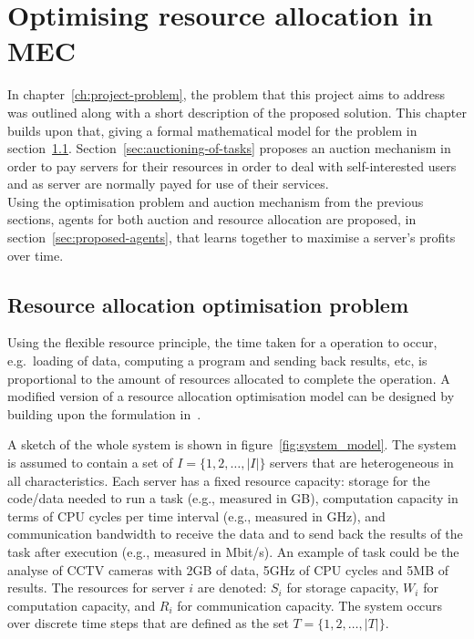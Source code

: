 
\chapter{Optimising resource allocation in MEC}\label{ch:proposed-solution}
In chapter~\ref{ch:project-problem}, the problem that this project aims to address was outlined along with a short
description of the proposed solution. This chapter builds upon that, giving a formal mathematical model for the problem
in section~\ref{sec:optimisation-problem}. Section~\ref{sec:auctioning-of-tasks} proposes an auction mechanism in order
to pay servers for their resources in order to deal with self-interested users and as server are normally payed for
use of their services. \\
Using the optimisation problem and auction mechanism from the previous sections, agents for both auction and resource
allocation are proposed, in section~\ref{sec:proposed-agents}, that learns together to maximise a server's profits
over time.

\section{Resource allocation optimisation problem}\label{sec:optimisation-problem}
Using the flexible resource principle, the time taken for a operation to occur, e.g.\ loading of data, computing
a program and sending back results, etc, is proportional to the amount of resources allocated to complete the operation.
A modified version of a resource allocation optimisation model can be designed by building upon the formulation
in~\cite{FlexibleResourceAllocation}.

A sketch of the whole system is shown in figure~\ref{fig:system_model}.
The system is assumed to contain a set of $I = \{1,2,\ldots,\left|I\right|\}$ servers that are heterogeneous in all
characteristics. Each server has a fixed resource capacity: storage for the code/data needed to run a task
(e.g., measured in GB), computation capacity in terms of CPU cycles per time interval (e.g., measured in GHz),
and communication bandwidth to receive the data and to send back the results of the task after execution
(e.g., measured in Mbit/s). An example of task could be the analyse of CCTV cameras with 2GB of data, 5GHz of CPU
cycles and 5MB of results. The resources for server $i$ are denoted: $S_i$ for storage capacity, $W_i$ for computation
capacity, and $R_i$ for communication capacity. The system occurs over discrete time steps that are defined as the set
$T = \{1,2,\ldots,\left|T\right|\}$.

